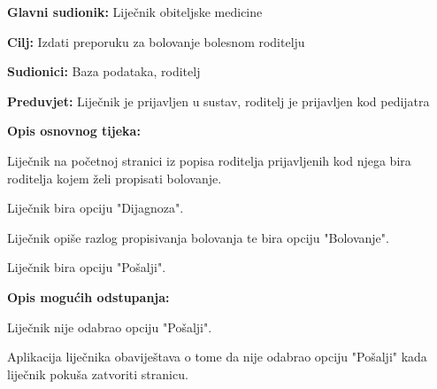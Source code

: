 					
					\noindent {}
					\begin{packed_item}
						
						\item \textbf{Glavni sudionik: }Liječnik obiteljske medicine
						\item  \textbf{Cilj:} Izdati preporuku za bolovanje bolesnom roditelju
						\item  \textbf{Sudionici:} Baza podataka, roditelj
						\item  \textbf{Preduvjet:} Liječnik je prijavljen u sustav, roditelj je prijavljen kod pedijatra
						\item  \textbf{Opis osnovnog tijeka:}
						
						\item[] \begin{packed_enum}
							
							\item Liječnik na početnoj stranici iz popisa roditelja prijavljenih kod njega bira roditelja kojem želi propisati bolovanje.
							\item Liječnik bira opciju "Dijagnoza".
							\item Liječnik opiše razlog propisivanja bolovanja te bira opciju "Bolovanje".
							\item Liječnik bira opciju "Pošalji".
						\end{packed_enum}
						
						\item  \textbf{Opis mogućih odstupanja:}
						
						\item[] \begin{packed_item}
							
							\item[4.a] Liječnik nije odabrao opciju "Pošalji".
							\item[] \begin{packed_enum}
								
								\item Aplikacija liječnika obaviještava o tome da nije odabrao opciju "Pošalji" kada liječnik pokuša zatvoriti stranicu.
							\end{packed_enum}
							
							
						\end{packed_item}
						
						
					\end{packed_item}
					
